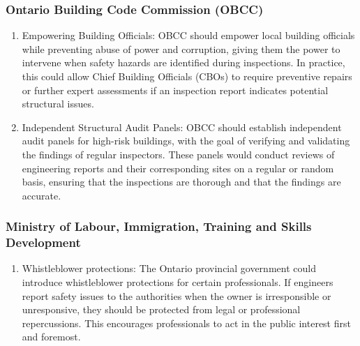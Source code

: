 \documentclass[12pt]{article}
\begin{document}
\subsubsection{Ontario Building Code Commission (OBCC)}

\begin{enumerate}
    \item Empowering Building Officials: OBCC should empower local building officials while preventing abuse of power and corruption, giving them the power to intervene when safety hazards are identified during inspections. In practice, this could allow Chief Building Officials (CBOs) to require preventive repairs or further expert assessments if an inspection report indicates potential structural issues. 
    
    \item Independent Structural Audit Panels: OBCC should establish independent audit panels for high-risk buildings, with the goal of verifying and validating the findings of regular inspectors. These panels would conduct reviews of engineering reports and their corresponding sites on a regular or random basis, ensuring that the inspections are thorough and that the findings are accurate.
\end{enumerate}


\subsubsection{Ministry of Labour, Immigration, Training and Skills Development}
\begin{enumerate}
    \item Whistleblower protections: The Ontario provincial government could introduce whistleblower protections for certain professionals. If engineers report safety issues to the authorities when the owner is irresponsible or unresponsive, they should be protected from legal or professional repercussions. This encourages professionals to act in the public interest first and foremost.
\end{enumerate}
\end{document}
